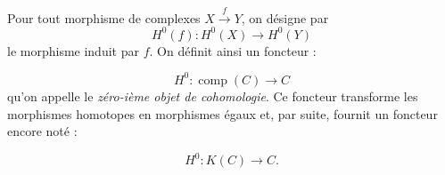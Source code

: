 Pour tout morphisme de complexes $X\xrightarrow{f}Y$, on désigne par
\[
  H^0(f)\colon H^0(X)\longrightarrow H^0(Y)
\]
\noindent le morphisme induit par $f$. On définit ainsi un foncteur :

\[
  H^0\colon\operatorname{comp}(C)\longrightarrow C
\]
\noindent qu'on appelle le \emph{zéro-ième objet de cohomologie}. Ce foncteur
transforme les morphismes homotopes en morphismes égaux et, par suite,
fournit un foncteur encore noté :

\[
  H^0\colon K(C)\longrightarrow C.
\]
\endgroup
